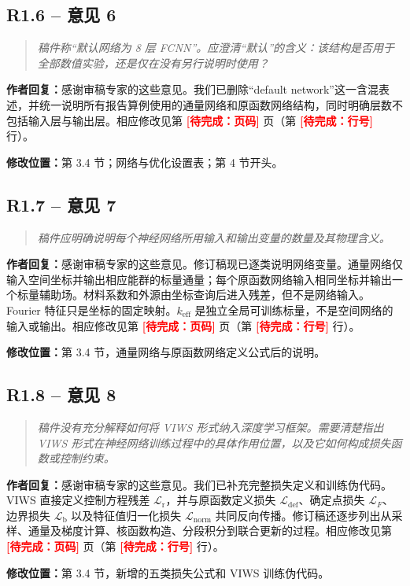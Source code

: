 \documentclass[11pt,a4paper]{article}
\newenvironment{reviewercomment}{\begin{quote}\small\itshape\color{commentgray}}{\end{quote}}
\newcommand{\authorresponse}{\noindent\textbf{作者回复：}\quad}
\newcommand{\revisionlocation}[1]{\par\noindent\textcolor{locationblue}{\textbf{修改位置：}}#1}
\newcommand{\draftplaceholder}[1]{\textcolor{red}{\textbf{[待完成：#1]}}}
\begin{document}
\subsection*{R1.6 -- 意见 6}
\begin{reviewercomment}
稿件称“默认网络为 8 层 FCNN”。应澄清“默认”的含义：该结构是否用于全部数值实验，还是仅在没有另行说明时使用？
\end{reviewercomment}
\authorresponse 感谢审稿专家的这些意见。我们已删除“default network”这一含混表述，并统一说明所有报告算例使用的通量网络和原函数网络结构，同时明确层数不包括输入层与输出层。相应修改见第 \draftplaceholder{页码} 页（第 \draftplaceholder{行号} 行）。
\revisionlocation{第 3.4 节；网络与优化设置表；第 4 节开头。}

\subsection*{R1.7 -- 意见 7}
\begin{reviewercomment}
稿件应明确说明每个神经网络所用输入和输出变量的数量及其物理含义。
\end{reviewercomment}
\authorresponse 感谢审稿专家的这些意见。修订稿现已逐类说明网络变量。通量网络仅输入空间坐标并输出相应能群的标量通量；每个原函数网络输入相同坐标并输出一个标量辅助场。材料系数和外源由坐标查询后进入残差，但不是网络输入。Fourier 特征只是坐标的固定映射。$k_{\mathrm{eff}}$ 是独立全局可训练标量，不是空间网络的输入或输出。相应修改见第 \draftplaceholder{页码} 页（第 \draftplaceholder{行号} 行）。
\revisionlocation{第 3.4 节，通量网络与原函数网络定义公式后的说明。}

\subsection*{R1.8 -- 意见 8}
\begin{reviewercomment}
稿件没有充分解释如何将 VIWS 形式纳入深度学习框架。需要清楚指出 VIWS 形式在神经网络训练过程中的具体作用位置，以及它如何构成损失函数或控制约束。
\end{reviewercomment}
\authorresponse 感谢审稿专家的这些意见。我们已补充完整损失定义和训练伪代码。VIWS 直接定义控制方程残差 $\mathcal L_{\mathrm r}$，并与原函数定义损失 $\mathcal L_{\mathrm{def}}$、确定点损失 $\mathcal L_F$、边界损失 $\mathcal L_{\mathrm b}$ 以及特征值归一化损失 $\mathcal L_{\mathrm{norm}}$ 共同反向传播。修订稿还逐步列出从采样、通量及梯度计算、核函数构造、分段积分到联合更新的过程。相应修改见第 \draftplaceholder{页码} 页（第 \draftplaceholder{行号} 行）。
\revisionlocation{第 3.4 节，新增的五类损失公式和 VIWS 训练伪代码。}
\end{document}

